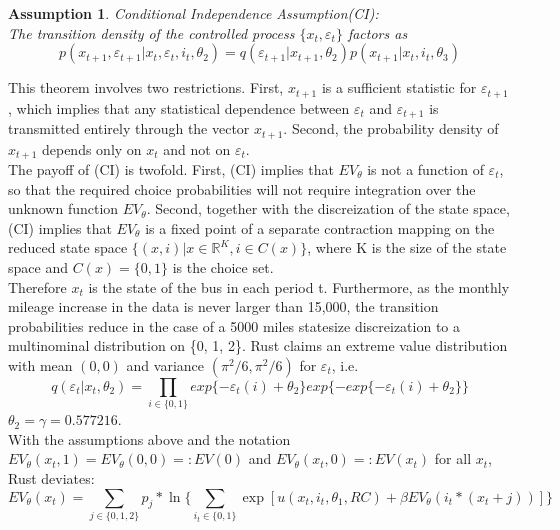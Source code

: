 \documentclass[a4paper,12pt,bold]{scrartcl}
\newtheorem{Assumption}{Assumption}
\begin{document}
\begin{Assumption}
Conditional Independence Assumption(CI):\\
The transition density of the controlled process \(\{x_t, \varepsilon_t\}\) factors as
\begin{equation}
  p(x_{t+1}, \varepsilon_{t+1} | x_t, \varepsilon_t, i_t, \theta_2) = q(\varepsilon_{t+1} | x_{t+1}, \theta_2) p(x_{t+1} | x_t, i_t, \theta_3)
\end{equation}
\end{Assumption}
This theorem involves two restrictions. First, \(x_{t+1}\) is a sufficient statistic for \(\varepsilon_{t+1}\), which implies that any statistical dependence between \(\varepsilon_t\) and \(\varepsilon_{t+1}\) is transmitted entirely through the vector \(x_{t+1}\). Second, the probability density of \(x_{t+1}\) depends only on \(x_t\) and not on \(\varepsilon_t\).\\ The payoff of (CI) is twofold. First, (CI) implies that \(EV_{\theta}\) is not a function of \(\varepsilon_t\), so that the required choice probabilities will not require integration over the unknown function \(EV_{\theta}\). Second, together with the discreization of the state space, (CI) implies that \(EV_{\theta}\) is a fixed point of a separate contraction mapping on the reduced state space \(\{(x, i)| x \in \mathbb{R}^{K} , i \in C(x)\} \), where K is the size of the state space and $C(x)=\{0, 1\}$ is the choice set.\medskip \\
Therefore $x_t$ is the state of the bus in each period t. Furthermore, as the monthly mileage increase in the data is never larger than 15,000, the transition probabilities reduce in the case of a 5000 miles statesize discreization to a multinominal distribution on \{0, 1, 2\}. Rust claims an extreme value distribution  with mean $(0,0)$ and variance $(\pi^2/6, \pi^2/6)$ for $\varepsilon_t$, i.e.
\begin{equation}
  q(\varepsilon_t|x_t, \theta_2) = \prod_{i \in \{0,1\}} exp\{-\varepsilon_t(i) + \theta_2\}exp\{-exp\{-\varepsilon_t(i)+\theta_2\}\}
\end{equation}
$\theta_2 = \gamma = 0.577216$.\\
With the assumptions above and the notation \(EV_{ \theta }( x_t, 1) = EV_{ \theta }( 0, 0) =: EV(0)\) and \(EV_{ \theta }( x_t, 0) =: EV(x_t)\) for all \(x_t\), Rust deviates:
\begin{equation}
  EV_{\theta}(x_t) = \sum_{j \in \{0 ,1, 2\}} p_j * \ln\{ \sum_{i_t \in \{0, 1\}} \exp[u(x_t, i_t, \theta_1, RC) + \beta EV_{\theta}(i_t * (x_t + j))]\}
\end{equation}
\end{document}
